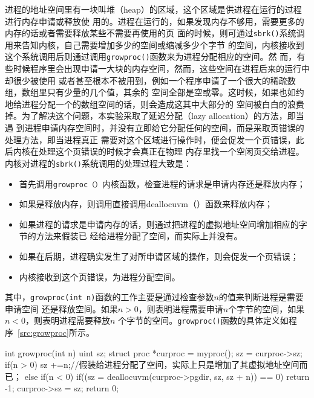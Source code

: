 \documentclass{swfuthesism}
\begin{document}
进程的地址空间里有一块叫堆（heap）的区域，这个区域是供进程在运行的过程进行内存申请或释放使
用的。进程在运行的，如果发现内存不够用，需要更多的内存的话或者需要释放某些不需要再使用的页
面的时候，则可通过\texttt{sbrk()}系统调用来告知内核，自己需要增加多少的空间或缩减多少个字节
的空间，内核接收到这个系统调用后则通过调用\texttt{growproc()}函数来为进程分配相应的空间。然
而，有些时候程序里会出现申请一大块的内存空间，然而，这些空间在进程后来的运行中却很少被使用
或者甚至根本不被用到，例如一个程序申请了一个很大的稀疏数组，数组里只有少量的几个值，其余的
空间全部是空或零。这时候，如果也如约地给进程分配一个的数组空间的话，则会造成这其中大部分的
空间被白白的浪费掉。为了解决这个问题，本实验采取了延迟分配（lazy allocation）的方法，即当遇
到进程申请内存空间时，并没有立即给它分配任何的空间，而是采取页错误的处理方法，即当进程真正
需要对这个区域进行操作时，便会促发一个页错误，此后内核在处理这个页错误的时候才会真正在物理
内存里找一个空闲页交给进程。内核对进程的\texttt{sbrk()}系统调用的处理过程大致是：
\begin{itemize}
\item 首先调用\texttt{growproc（）}内核函数，检查进程的请求是申请内存还是释放内存；
\item 如果是释放内存，则调用直接调用deallocuvm（）函数来释放内存；
\item 如果进程的请求是申请内存的话，则通过把进程的虚拟地址空间增加相应的字节的方法来假装已
  经给进程分配了空间，而实际上并没有。
\item 如果在后期，进程确实发生了对所申请区域的操作，则会促发一个页错误；
\item 内核接收到这个页错误，为进程分配空间。
\end{itemize}
其中，\texttt{growproc(int n)}函数的工作主要是通过检查参数$n$的值来判断进程是需要申请空间
还是释放空间。如果$n>0$，则表明进程需要申请$n$个字节的空间，如果$n<0$，则表明进程需要释放$n$
个字节的空间。\texttt{growproc()}函数的具体定义如程序~\ref{src:growproc}所示。

\begin{listing}
  \begin{codeblock}
\begin{ccode}
int growproc(int n)
{
  uint sz;
  struct proc *curproc = myproc();
  sz = curproc->sz;
  if(n > 0){ 
    sz +=n;//假装给进程分配了空间，实际上只是增加了其虚拟地址空间而已；
   } else if(n < 0){
    if((sz = deallocuvm(curproc->pgdir, sz, sz + n)) == 0)
      return -1;
  }
  curproc->sz = sz;
  return 0;
}
\end{ccode}
  \end{codeblock}
  \label{src:growproc}
\end{listing}
\end{document}
